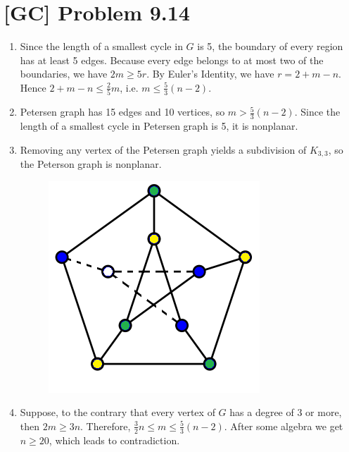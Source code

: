 \documentclass[a4paper,11pt,twocolumn]{article}
\begin{document}
  \section{[GC] Problem 9.14}
  \begin{enumerate}
    \item Since the length of a smallest cycle in $G$ is 5, the boundary of every region has at least 5 edges. Because every edge belongs to at most two of the boundaries, we have $2m \geq 5r$. By Euler's Identity, we have $r=2+m-n$. Hence $2+m-n\leq\frac{2}{5}m$, i.e. $m \leq \frac{5}{3}(n-2)$.
    \item Petersen graph has 15 edges and 10 vertices, so $m > \frac{5}{3}(n-2)$. Since the length of a smallest cycle in Petersen graph is 5, it is nonplanar.
    \item Removing any vertex of the Petersen graph yields a subdivision of $K_{3,3}$, so the Peterson graph is nonplanar.
    \begin{figure}[h]
        \centering
        \includegraphics{petersen_nonplanar.png}\\
    \end{figure}
    \item Suppose, to the contrary that every vertex of $G$ has a degree of 3 or more, then $2m \geq 3n$. Therefore, $\frac{3}{2}n \leq m \leq \frac{5}{3}(n-2)$. After some algebra we get $n \geq 20$, which leads to contradiction.
  \end{enumerate}
\end{document}
